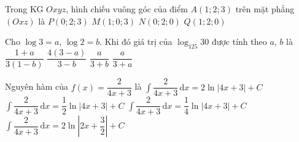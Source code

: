 \begin{ex}%
Trong KG $Oxyz$, hình chiếu vuông góc của điểm $A(1;2;3)$ trên mặt phẳng $\left(Oxz\right)$ là
	\choice
	{$P(0;2;3)$}
	{\True $M(1;0;3)$}
	{$N(0;2;0)$}
	{$Q(1;2;0)$}
\end{ex}
\begin{ex}%
	Cho $\log3=a$, $\log2=b$. Khi đó giá trị của $\log_{125}30$ được tính theo $a$, $b$ là 
	\choice
	{\True $\dfrac{1+a}{3(1-b)}$}
	{$\dfrac{4(3-a)}{3-b}$}
	{$\dfrac{a}{3+b}$}
	{$\dfrac{a}{3+a}$}
\end{ex}
\begin{ex}%
	Nguyên hàm của $f(x)=\dfrac{2}{4x+3}$ là 
	\choice
	{$\displaystyle\int\limits \dfrac{2}{4x+3}\mathrm{\,d}x=2\ln \left|4x+3\right|+C$}
	{\True $\displaystyle\int\limits \dfrac{2}{4x+3}\mathrm{\,d}x=\dfrac{1}{2}\ln \left|4x+3\right|+C$}
	{$\displaystyle\int\limits \dfrac{2}{4x+3}\mathrm{\,d}x=\dfrac{1}{4}\ln \left|4x+3\right|+C$}
	{$\displaystyle\int\limits \dfrac{2}{4x+3}\mathrm{\,d}x=2\ln \left|2x+\dfrac{3}{2}\right|+C$}
\end{ex}


